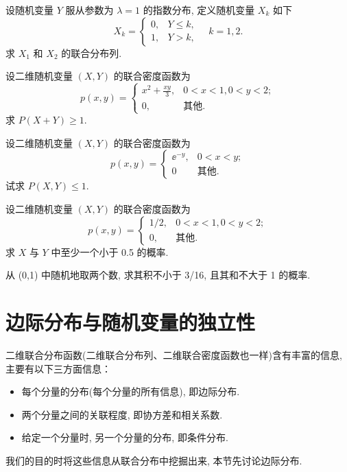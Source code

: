\begin{xiti}
\begin{enumerate}[(1)]
	 	\end{enumerate}
	 	\item 设随机变量 $Y$ 服从参数为 $\lambda=1$ 的指数分布, 定义随机变量 $X_k$ 如下
	 	\[
	 	 	X_k=\begin{cases}
	 	 		0,&		Y\leq k, \\
	 	 		1,&		Y>k,
	 	 	\end{cases} \quad k=1,2.
	 	\]
	 	求 $X_1$ 和 $X_2$ 的联合分布列.
	 	\item 设二维随机变量 $(X,Y)$ 的联合密度函数为
	 	\[
	 	 	p(x,y)=\begin{cases}
	 	 		x^2+\frac{xy}{3},&	0<x<1,0<y<2;\\
	 	 		0,		&			\text{其他} .
	 	 	\end{cases}
	 	\]
	 	求 $P(X+Y)\geq 1$.
	 	\item 设二维随机变量 $(X,Y)$ 的联合密度函数为
	 	\[
	 	 	p(x,y)=\begin{cases}
	 	 		\ee^{-y},	&	0<x<y;\\
	 	 		0&			\text{其他} .
	 	 	\end{cases}
	 	\]
	 	试求 $P(X,Y)\leq 1$.
	 	\item 设二维随机变量 $(X,Y)$ 的联合密度函数为
	 	\[
	 	 	p(x,y)=\begin{cases}
	 	 		1/2,&	0<x<1,0<y<2;\\
	 	 		0,&		\text{其他} .	
	 	 	\end{cases}
	 	\]
	 	求 $X$ 与 $Y$ 中至少一个小于 0.5 的概率.
	 	\item 从 (0,1) 中随机地取两个数, 求其积不小于 3/16, 且其和不大于 1 的概率.
	 \end{xiti}

	\section{边际分布与随机变量的独立性}\label{sec:3.2}
  二维联合分布函数(二维联合分布列、二维联合密度函数也一样)含有丰富的信息, 主要有以下三方面信息：
  \begin{itemize}
  	\item 每个分量的分布(每个分量的所有信息), 即边际分布.
  	\item 两个分量之间的关联程度, 即协方差和相关系数.
  	\item 给定一个分量时, 另一个分量的分布, 即条件分布.
  \end{itemize}
  我们的目的时将这些信息从联合分布中挖掘出来, 本节先讨论边际分布.
  
